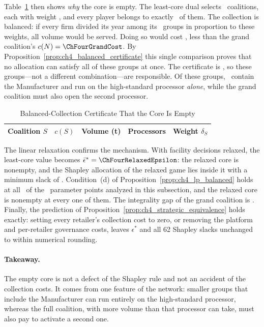 Table~\ref{tab:ch4_certificate} then shows \emph{why} the core is empty. The least-core dual selects \ChFourCertificateSize\ coalitions, each with weight \ChFourCertificateWeight, and every player belongs to exactly \ChFourCertificateCoverage\ of them. The collection is balanced: if every firm divided its year among its \ChFourCertificateCoverage\ groups in proportion to these weights, all volume would be served. Doing so would cost \ChFourCertificateCost, less than the grand coalition's $c(N)=\ChFourGrandCost$. By Proposition~\ref{prop:ch4_balanced_certificate} this single comparison proves that no allocation can satisfy all of these groups at once. The certificate is \ChFourCertificateUnique, so these groups---not a different combination---are responsible. Of these groups, \ChFourCertificateWithManufacturer\ contain the Manufacturer and run on the high-standard processor \emph{alone}, while the grand coalition must also open the second processor.

\begin{table}[htbp]
\centering
\caption{Balanced-Collection Certificate That the Core Is Empty}
\label{tab:ch4_certificate}
\begin{tabular}{lcccc}
\toprule
\textbf{Coalition $S$} & \textbf{$c(S)$} & \textbf{Volume (t)} & \textbf{Processors} & \textbf{Weight $\delta_S$} \\
\midrule

\end{tabular}
\end{table}

The linear relaxation confirms the mechanism. With facility decisions relaxed, the least-core value becomes $\bar\epsilon^*=\ChFourRelaxedEpsilon$: the relaxed core is nonempty, and the Shapley allocation of the relaxed game lies inside it with a minimum slack of \ChFourRelaxedShapleySlack. Condition~(d) of Proposition~\ref{prop:ch4_lp_balanced} holds at all \ChFourOwenPoints\ of the \ChFourDiagnosisPoints\ parameter points analyzed in this subsection, and the relaxed core is nonempty at every one of them. The integrality gap of the grand coalition is \ChFourIntegralityGap. Finally, the prediction of Proposition~\ref{prop:ch4_strategic_equivalence} holds exactly: setting every retailer's collection cost to zero, or removing the platform and per-retailer governance costs, leaves $\epsilon^*$ and all 62 Shapley slacks unchanged to within numerical rounding.

\paragraph{Takeaway.} The empty core is not a defect of the Shapley rule and not an accident of the collection costs. It comes from one feature of the network: smaller groups that include the Manufacturer can run entirely on the high-standard processor, whereas the full coalition, with more volume than that processor can take, must also pay to activate a second one.

